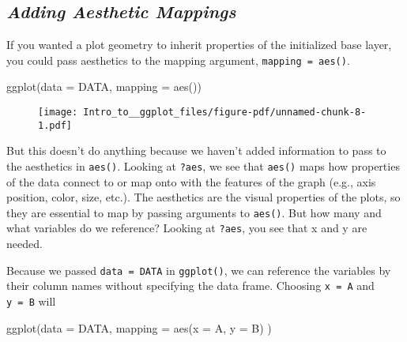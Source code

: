 \documentclass[
  letterpaper,
  DIV=11,
  numbers=noendperiod]{scrartcl}
\newenvironment{Shaded}{\begin{snugshade}}{\end{snugshade}}
\newcommand{\AttributeTok}[1]{\textcolor[rgb]{0.40,0.45,0.13}{#1}}
\newcommand{\FunctionTok}[1]{\textcolor[rgb]{0.28,0.35,0.67}{#1}}
\newcommand{\NormalTok}[1]{\textcolor[rgb]{0.00,0.23,0.31}{#1}}
\begin{document}
\hypertarget{adding-aesthetic-mappings}{%
\subsection{\texorpdfstring{\emph{Adding Aesthetic
Mappings}}{Adding Aesthetic Mappings}}\label{adding-aesthetic-mappings}}

If you wanted a plot geometry to inherit properties of the initialized
base layer, you could pass aesthetics to the mapping argument,
\texttt{mapping\ =\ aes()}.

\begin{Shaded}
\begin{Highlighting}[]
\FunctionTok{ggplot}\NormalTok{(}\AttributeTok{data =}\NormalTok{ DATA, }\AttributeTok{mapping =} \FunctionTok{aes}\NormalTok{())}
\end{Highlighting}
\end{Shaded}

\begin{figure}[H]

{\centering \texttt{[image: Intro\_to\_\_ggplot\_files/figure-pdf/unnamed-chunk-8-1.pdf]}

}

\end{figure}

But this doesn't do anything because we haven't added information to
pass to the aesthetics in \texttt{aes()}. Looking at \texttt{?aes}, we
see that \texttt{aes()} maps how properties of the data connect to or
map onto with the features of the graph (e.g., axis position, color,
size, etc.). The aesthetics are the visual properties of the plots, so
they are essential to map by passing arguments to \texttt{aes()}. But
how many and what variables do we reference? Looking at \texttt{?aes},
you see that x and y are needed.

Because we passed \texttt{data\ =\ DATA} in \texttt{ggplot()}, we can
reference the variables by their column names without specifying the
data frame. Choosing \texttt{x\ =\ A} and \texttt{y\ =\ B} will

\begin{Shaded}
\begin{Highlighting}[]
\FunctionTok{ggplot}\NormalTok{(}\AttributeTok{data =}\NormalTok{ DATA, }
       \AttributeTok{mapping =} \FunctionTok{aes}\NormalTok{(}\AttributeTok{x =}\NormalTok{ A, }\AttributeTok{y =}\NormalTok{ B)}
\NormalTok{       )}
\end{Highlighting}
\end{Shaded}
\end{document}
